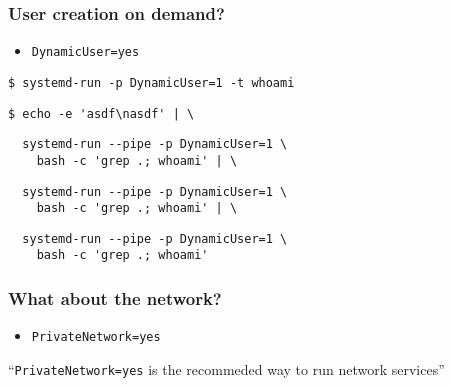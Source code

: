 \documentclass[serif]{beamer}
\begin{document}
\begin{frame}[fragile]
  \frametitle{User creation on demand?}
  \pause
  \begin{itemize}
  \item \texttt{DynamicUser=yes}
  \end{itemize}

  \pause

  \begin{verbatim}
$ systemd-run -p DynamicUser=1 -t whoami
  \end{verbatim}

  \pause

  \begin{verbatim}
$ echo -e 'asdf\nasdf' | \
  \end{verbatim}
  \pause
  \begin{verbatim}
  systemd-run --pipe -p DynamicUser=1 \
    bash -c 'grep .; whoami' | \
  \end{verbatim}
  \pause
  \begin{verbatim}
  systemd-run --pipe -p DynamicUser=1 \
    bash -c 'grep .; whoami' | \
  \end{verbatim}
  \pause
  \begin{verbatim}
  systemd-run --pipe -p DynamicUser=1 \
    bash -c 'grep .; whoami'
  \end{verbatim}
\end{frame}

\begin{frame}
  \frametitle{What about the network?}

  \pause

  \begin{itemize}
  \item \texttt{PrivateNetwork=yes}
  \end{itemize}

  \pause

  ``\texttt{PrivateNetwork=yes} is the recommeded way to run network services''
\end{frame}
\end{document}
